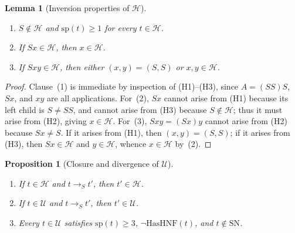 \documentclass[11pt,reqno]{amsart}
\newtheorem{proposition}[theorem]{Proposition}
\newtheorem{lemma}[theorem]{Lemma}
\theoremstyle{definition}
\theoremstyle{remark}
\newcommand{\SN}{\mathrm{SN}}
\newcommand{\toS}{\to_S}
\begin{document}
\begin{lemma}[Inversion properties of $\mathcal{H}$]\label{lem:heavy-inv}
\begin{enumerate}
  \item $S \notin \mathcal{H}$ and $\mathrm{sp}(t) \ge 1$ for every $t \in \mathcal{H}$.
  \item If $S x \in \mathcal{H}$, then $x \in \mathcal{H}$.
  \item If $S x y \in \mathcal{H}$, then either $(x, y) = (S, S)$ or $x, y \in \mathcal{H}$.
\end{enumerate}
\end{lemma}

\begin{proof}
Clause~(1) is immediate by inspection of (H1)--(H3), since $A = (S S) S$, $S x$, and $x y$ are all applications. For~(2), $S x$ cannot arise from (H1) because its left child is $S \neq S S$, and cannot arise from (H3) because $S \notin \mathcal{H}$; thus it must arise from (H2), giving $x \in \mathcal{H}$. For~(3), $S x y = (S x) y$ cannot arise from (H2) because $S x \neq S$. If it arises from (H1), then $(x, y) = (S, S)$; if it arises from (H3), then $S x \in \mathcal{H}$ and $y \in \mathcal{H}$, whence $x \in \mathcal{H}$ by~(2).
\end{proof}

\begin{proposition}[Closure and divergence of $\mathcal{U}$]\label{prop:U}
\begin{enumerate}
  \item If $t \in \mathcal{H}$ and $t \toS t'$, then $t' \in \mathcal{H}$.
  \item If $t \in \mathcal{U}$ and $t \toS t'$, then $t' \in \mathcal{U}$.
  \item Every $t \in \mathcal{U}$ satisfies $\mathrm{sp}(t) \ge 3$, $\neg \mathrm{HasHNF}(t)$, and $t \notin \SN$.
\end{enumerate}
\end{proposition}
\end{document}
